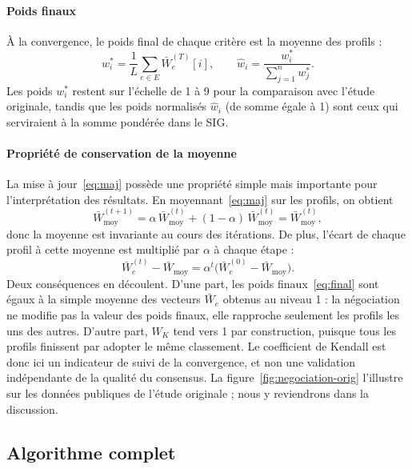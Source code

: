 \documentclass[11pt,a4paper]{article}
\newcommand{\Wbar}{\bar{W}}
\newcommand{\Wmoy}{\bar{W}_{\mathrm{moy}}}
\begin{document}
\paragraph{Poids finaux} À la convergence, le poids final de chaque critère est la moyenne des profils :
\begin{equation}\label{eq:final}
  w_i^*=\frac{1}{L}\sum_{e\in E}\Wbar_e^{(T)}[i],\qquad \hat w_i=\frac{w_i^*}{\sum_{j=1}^{n}w_j^*}.
\end{equation}
Les poids $w_i^*$ restent sur l'échelle de 1 à 9 pour la comparaison avec l'étude originale, tandis que les poids normalisés $\hat w_i$ (de somme égale à 1) sont ceux qui serviraient à la somme pondérée dans le SIG.

\paragraph{Propriété de conservation de la moyenne} La mise à jour~\eqref{eq:maj} possède une propriété simple mais importante pour l'interprétation des résultats. En moyennant~\eqref{eq:maj} sur les profils, on obtient
\begin{equation}\label{eq:conservation}
  \Wmoy^{(t+1)}=\alpha\,\Wmoy^{(t)}+(1-\alpha)\,\Wmoy^{(t)}=\Wmoy^{(t)},
\end{equation}
donc la moyenne est invariante au cours des itérations. De plus, l'écart de chaque profil à cette moyenne est multiplié par $\alpha$ à chaque étape :
\begin{equation}\label{eq:contraction}
  \Wbar_e^{(t)}-\Wmoy=\alpha^{t}\bigl(\Wbar_e^{(0)}-\Wmoy\bigr).
\end{equation}
Deux conséquences en découlent. D'une part, les poids finaux~\eqref{eq:final} sont égaux à la simple moyenne des vecteurs $\Wbar_e$ obtenus au niveau 1 : la négociation ne modifie pas la valeur des poids finaux, elle rapproche seulement les profils les uns des autres. D'autre part, $W_K$ tend vers 1 par construction, puisque tous les profils finissent par adopter le même classement. Le coefficient de Kendall est donc ici un indicateur de suivi de la convergence, et non une validation indépendante de la qualité du consensus. La figure~\ref{fig:negociation-orig} l'illustre sur les données publiques de l'étude originale ; nous y reviendrons dans la discussion.

\subsection{Algorithme complet}
\end{document}
